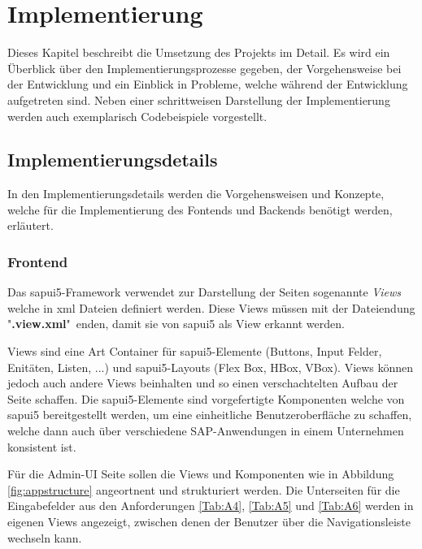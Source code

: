 \section{Implementierung}
Dieses Kapitel beschreibt die Umsetzung des Projekts im Detail. Es wird ein Überblick über den Implementierungsprozesse gegeben, der Vorgehensweise bei der Entwicklung und ein Einblick in Probleme, welche während der Entwicklung aufgetreten sind.
Neben einer schrittweisen Darstellung der Implementierung werden auch exemplarisch Codebeispiele vorgestellt.
\subsection[Implementierungsdetails]{Implementierungsdetails}
In den Implementierungsdetails werden die Vorgehensweisen und Konzepte, welche für die Implementierung des Fontends und Backends benötigt werden, erläutert.

\subsubsection[Frontend]{Frontend}
Das \gls{sapui5}-Framework verwendet zur Darstellung der Seiten sogenannte \textit{Views} welche in \gls{xml} Dateien definiert werden.
Diese Views müssen mit der Dateiendung "\textbf{.view.xml}"\ enden, damit sie von \gls{sapui5} als View erkannt werden.

Views sind eine Art Container für \gls{sapui5}-Elemente (Buttons, Input Felder, Enitäten, Listen, ...) und \gls{sapui5}-Layouts (Flex Box, HBox, VBox).
Views können jedoch auch andere Views beinhalten und so einen verschachtelten Aufbau der Seite schaffen.
Die \gls{sapui5}-Elemente sind vorgefertigte Komponenten welche von \gls{sapui5} bereitgestellt werden, um eine einheitliche Benutzeroberfläche zu schaffen, welche dann auch über verschiedene SAP-Anwendungen in einem Unternehmen konsistent ist.

Für die Admin-UI Seite sollen die Views und Komponenten wie in Abbildung \ref{fig:appstructure} angeortnent und strukturiert werden.
Die Unterseiten für die Eingabefelder aus den Anforderungen \ref{Tab:A4}, \ref{Tab:A5} und \ref{Tab:A6} werden in eigenen Views angezeigt, zwischen denen der Benutzer über die Navigationsleiste wechseln kann.

